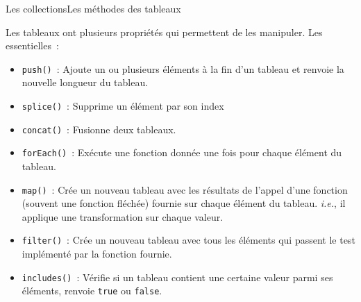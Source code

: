 \documentclass{beamer}
\begin{document}
    \begin{frame}{Les collections}{Les méthodes des tableaux}
        \begin{footnotesize}
            Les tableaux ont plusieurs propriétés qui permettent de les manipuler.
            Les essentielles~:
            \begin{itemize}
                \item \lstinline{push()}~: Ajoute un ou plusieurs éléments à la fin d'un tableau et renvoie la nouvelle longueur du tableau.
                \item \lstinline{splice()}~: Supprime un élément par son index
                \item \lstinline{concat()}~: Fusionne deux tableaux.
                \item \lstinline{forEach()}~: Exécute une fonction donnée une fois pour chaque élément du tableau.
                \item \lstinline{map()}~: Crée un nouveau tableau avec les résultats de l'appel d'une fonction (souvent une fonction fléchée) fournie sur chaque élément du tableau. \textit{i.e.}, il applique une transformation sur chaque valeur.
                \item \lstinline{filter()}~: Crée un nouveau tableau avec tous les éléments qui passent le test implémenté par la fonction fournie.
                \item \lstinline{includes()}~: Vérifie si un tableau contient une certaine valeur parmi ses éléments, renvoie \lstinline{true} ou \lstinline{false}.
            \end{itemize}
        \end{footnotesize}
    \end{frame}
\end{document}
